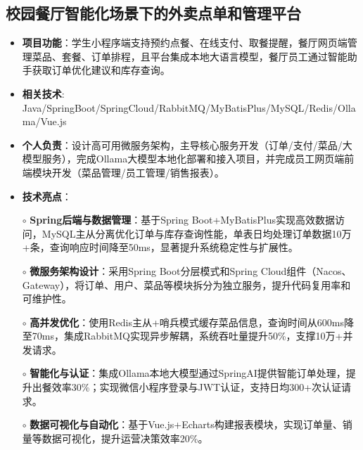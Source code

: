 \subsection{\textbf{校园餐厅智能化场景下的外卖点单和管理平台} \hspace{2cm}{2025.01 -- 2025.04}}
    \begin{normalsize}
      \begin{itemize}
        \item \textbf{项目功能}：学生小程序端支持预约点餐、在线支付、取餐提醒，餐厅网页端管理菜品、套餐、订单排程，且平台集成本地大语言模型，餐厅员工通过智能助手获取订单优化建议和库存查询。
        \item \textbf{相关技术}: Java/SpringBoot/SpringCloud/RabbitMQ/MyBatisPlus/MySQL/Redis/Ollama/Vue.js
        \item \textbf{个人负责}：设计高可用微服务架构，主导核心服务开发（订单/支付/菜品/大模型服务），完成Ollama大模型本地化部署和接入项目，并完成员工网页端前端模块开发（菜品管理/员工管理/销售报表）。
        \item \textbf{技术亮点}：
        \setlength{\itemindent}{1em} %
          \item[$\circ$] \textbf{Spring后端与数据管理}：基于Spring Boot+MyBatisPlus实现高效数据访问，MySQL主从分离优化订单与库存查询性能，单表日均处理订单数据10万+条，查询响应时间降至50ms，显著提升系统稳定性与扩展性。
          \item[$\circ$] \textbf{微服务架构设计}：采用Spring Boot分层模式和Spring Cloud组件（Nacos、Gateway），将订单、用户、菜品等模块拆分为独立服务，提升代码复用率和可维护性。
          \item[$\circ$] \textbf{高并发优化}：使用Redis主从+哨兵模式缓存菜品信息，查询时间从600ms降至70ms，集成RabbitMQ实现异步解耦，系统吞吐量提升50\%，支撑10万+并发请求。
          \item[$\circ$] \textbf{智能化与认证}：集成Ollama本地大模型通过SpringAI提供智能订单处理，提升出餐效率30\%；实现微信小程序登录与JWT认证，支持日均300+次认证请求。
          \item[$\circ$] \textbf{数据可视化与自动化}：基于Vue.js+Echarts构建报表模块，实现订单量、销量等数据可视化，提升运营决策效率20\%。
        \end{itemize}
    \end{normalsize}